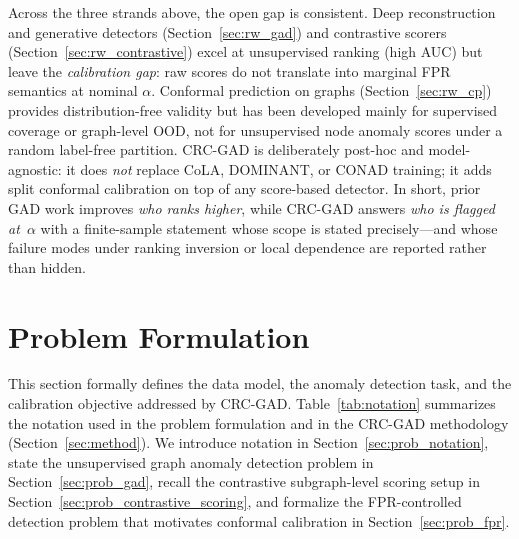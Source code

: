 \documentclass[a4paper]{cas-dc}
\theoremstyle{definition}
\begin{document}
Across the three strands above, the open gap is consistent.
Deep reconstruction and generative detectors (Section~\ref{sec:rw_gad}) and contrastive scorers (Section~\ref{sec:rw_contrastive}) excel at unsupervised ranking (high AUC) but leave the \emph{calibration gap}: raw scores do not translate into marginal FPR semantics at nominal $\alpha$.
Conformal prediction on graphs (Section~\ref{sec:rw_cp}) provides distribution-free validity but has been developed mainly for supervised coverage or graph-level OOD, not for unsupervised node anomaly scores under a random label-free partition.
CRC-GAD is deliberately post-hoc and model-agnostic: it does \emph{not} replace CoLA, DOMINANT, or CONAD training; it adds split conformal calibration on top of any score-based detector.
In short, prior GAD work improves \emph{who ranks higher}, while CRC-GAD answers \emph{who is flagged at~$\alpha$} with a finite-sample statement whose scope is stated precisely---and whose failure modes under ranking inversion or local dependence are reported rather than hidden.

\section{Problem Formulation}
\label{sec:problem}

This section formally defines the data model, the anomaly detection task, and the calibration objective addressed by CRC-GAD.  Table~\ref{tab:notation} summarizes the notation used in the problem formulation and in the CRC-GAD methodology (Section~\ref{sec:method}).  We introduce notation in Section~\ref{sec:prob_notation}, state the unsupervised graph anomaly detection problem in Section~\ref{sec:prob_gad}, recall the contrastive subgraph-level scoring setup in Section~\ref{sec:prob_contrastive_scoring}, and formalize the FPR-controlled detection problem that motivates conformal calibration in Section~\ref{sec:prob_fpr}.
\end{document}
